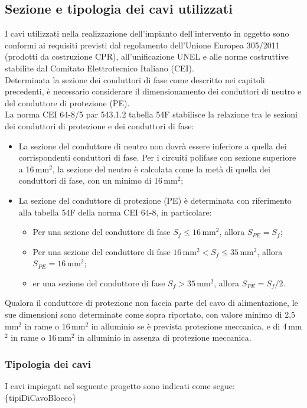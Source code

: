 \subsection{Sezione e tipologia dei cavi utilizzati}
I cavi utilizzati nella realizzazione dell’impianto dell’intervento in oggetto sono conformi ai requisiti previsti dal regolamento dell’Unione Europea 305/2011 (prodotti da costruzione CPR), all’unificazione UNEL e alle norme costruttive stabilite dal Comitato Elettrotecnico Italiano (CEI). \\
Determinata la sezione dei conduttori di fase come descritto nei capitoli precedenti, è necessario considerare il dimensionamento dei conduttori di neutro e del conduttore di protezione (PE). \\
La norma CEI 64-8/5 par 543.1.2 tabella 54F stabilisce la relazione tra le sezioni dei conduttori di protezione e dei conduttori di fase:

\begin{itemize}
\item La sezione del conduttore di neutro non dovrà essere inferiore a quella dei corrispondenti conduttori di fase. Per i circuiti polifase con sezione superiore a 16\,mm$^2$, la sezione del neutro è calcolata come la metà di quella dei conduttori di fase, con un minimo di 16\,mm$^2$;
\item La sezione del conduttore di protezione (PE) è determinata con riferimento alla tabella 54F della norma CEI 64-8, in particolare:

\begin{itemize}
\item Per una sezione del conduttore di fase $S_f \leq 16$\,mm$^2$, allora $S_{PE} = S_f$;
\item Per una sezione del conduttore di fase $16$\,mm$^2 < S_f \leq 35$\,mm$^2$, allora $S_{PE} = 16$\,mm$^2$;
\item er una sezione del conduttore di fase $S_f > 35$\,mm$^2$, allora $S_{PE} = S_f/2$.
\end{itemize}
\end{itemize}

Qualora il conduttore di protezione non faccia parte del cavo di alimentazione, le sue dimensioni sono determinate come sopra riportato, con valore minimo di 2,5\,mm$^2$ in rame o 16\,mm$^2$ in alluminio se è prevista protezione meccanica, e di 4\,mm$^2$ in rame o 16\,mm$^2$ in alluminio in assenza di protezione meccanica.


\subsubsection{Tipologia dei cavi}
I cavi impiegati nel seguente progetto sono indicati come segue:
\{tipiDiCavoBlocco\}


